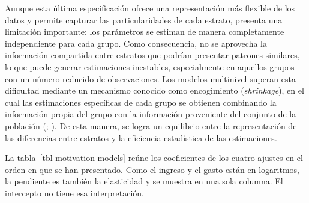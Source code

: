 \documentclass[
  spanish,
  11pt,
  letterpaper,
  oneside,
  open=any]{scrbook}
\begin{document}
Aunque esta última especificación ofrece una representación más flexible
de los datos y permite capturar las particularidades de cada estrato,
presenta una limitación importante: los parámetros se estiman de manera
completamente independiente para cada grupo. Como consecuencia, no se
aprovecha la información compartida entre estratos que podrían presentar
patrones similares, lo que puede generar estimaciones inestables,
especialmente en aquellos grupos con un número reducido de
observaciones. Los modelos multinivel superan esta dificultad mediante
un mecanismo conocido como encogimiento (\emph{shrinkage}), en el cual
las estimaciones específicas de cada grupo se obtienen combinando la
información propia del grupo con la información proveniente del conjunto
de la población (;
). De esta manera,
se logra un equilibrio entre la representación de las diferencias entre
estratos y la eficiencia estadística de las estimaciones.

La tabla~\ref{tbl-motivation-models} reúne los coeficientes de los
cuatro ajustes en el orden en que se han presentado. Como el ingreso y
el gasto están en logaritmos, la pendiente es también la elasticidad y
se muestra en una sola columna. El intercepto no tiene esa
interpretación.
\end{document}
